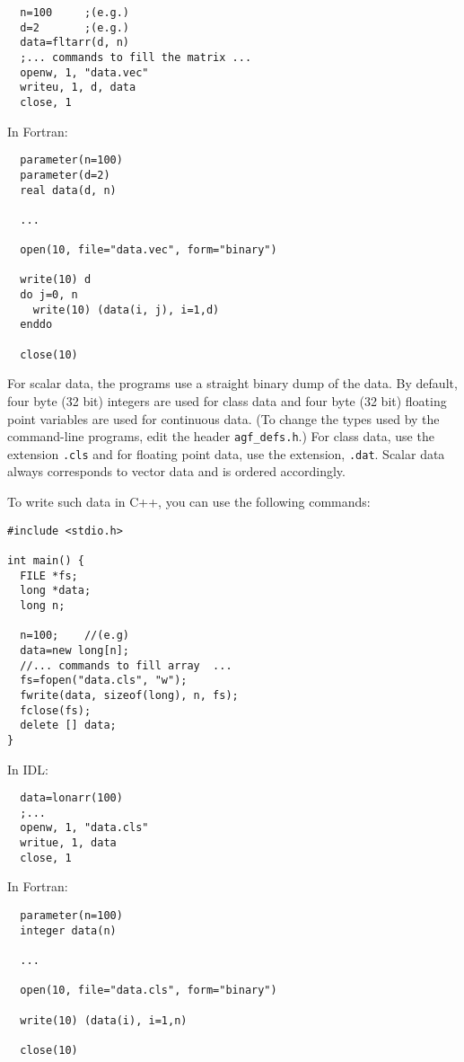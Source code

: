 \documentclass[12pt]{article}
\begin{document}
\begin{verbatim}
  n=100		;(e.g.)
  d=2		;(e.g.)
  data=fltarr(d, n)
  ;... commands to fill the matrix ...
  openw, 1, "data.vec"
  writeu, 1, d, data
  close, 1
\end{verbatim}

In Fortran:

\begin{verbatim}
  parameter(n=100)
  parameter(d=2)
  real data(d, n)

  ...

  open(10, file="data.vec", form="binary")
 
  write(10) d
  do j=0, n
    write(10) (data(i, j), i=1,d)
  enddo

  close(10)
\end{verbatim}

For scalar data, the programs use a straight binary dump of the data.  By default, four byte (32 bit) integers are used for class data and four byte (32 bit) floating point variables are used for continuous data. (To change the types used by the command-line programs, edit the header \verb/agf_defs.h/.) For class data, use the extension \verb".cls" and for floating point data, use the extension, \verb".dat".  Scalar data always corresponds to vector data and is ordered accordingly.


To write such data in C++, you can use the following commands:

\begin{verbatim}
#include <stdio.h>

int main() {
  FILE *fs;
  long *data;
  long n;

  n=100;	//(e.g)
  data=new long[n];
  //... commands to fill array  ...
  fs=fopen("data.cls", "w");
  fwrite(data, sizeof(long), n, fs);
  fclose(fs);
  delete [] data;
}
\end{verbatim}

In IDL:

\begin{verbatim}
  data=lonarr(100)
  ;...
  openw, 1, "data.cls"
  writue, 1, data
  close, 1
\end{verbatim}

In Fortran:

\begin{verbatim}
  parameter(n=100)
  integer data(n)

  ...

  open(10, file="data.cls", form="binary")
 
  write(10) (data(i), i=1,n)

  close(10)
\end{verbatim}
\end{document}
